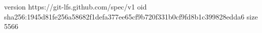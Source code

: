 version https://git-lfs.github.com/spec/v1
oid sha256:1945d81fe256a58682f1defa377ee65cf9b720f331b0cf9fd8b1c399828edda6
size 5566
